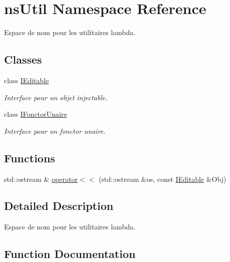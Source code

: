 \hypertarget{namespacens_util}{}\section{ns\+Util Namespace Reference}
\label{namespacens_util}


Espace de nom pour les utilitaires lambda.  


\subsection*{Classes}
\begin{DoxyCompactItemize}
\item 
class \hyperlink{classns_util_1_1_i_editable}{I\+Editable}
\begin{DoxyCompactList}\small\item\em Interface pour un objet injectable. \end{DoxyCompactList}\item 
class \hyperlink{classns_util_1_1_i_fonctor_unaire}{I\+Fonctor\+Unaire}
\begin{DoxyCompactList}\small\item\em Interface pour un fonctor unaire. \end{DoxyCompactList}\end{DoxyCompactItemize}
\subsection*{Functions}
\begin{DoxyCompactItemize}
\item 
std\+::ostream \& \hyperlink{namespacens_util_a95ba3ba3ebef98e447b47ee40f55dd1a}{operator$<$$<$} (std\+::ostream \&os, const \hyperlink{classns_util_1_1_i_editable}{I\+Editable} \&Obj)
\end{DoxyCompactItemize}


\subsection{Detailed Description}
Espace de nom pour les utilitaires lambda. 

\subsection{Function Documentation}
\mbox{\label{namespacens_util_a95ba3ba3ebef98e447b47ee40f55dd1a}} 
